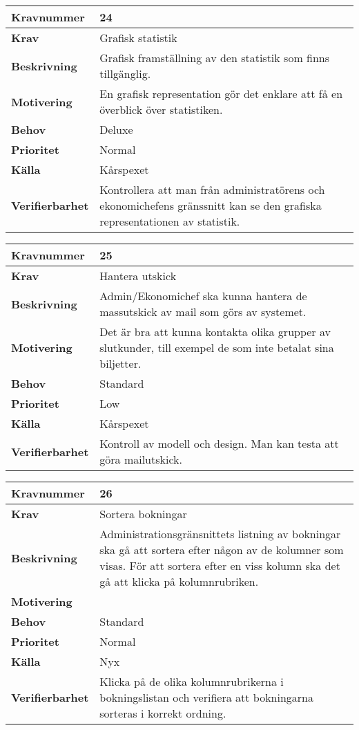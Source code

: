 \documentclass[a4paper, twoside, 11pt, titlepage]{article}
\begin{document}
\begin{tabular} { | p{3cm} | p{12.2cm} | }
	\hline
	\textbf{Kravnummer} & 24  \\
	\hline
	\textbf{Krav} & Grafisk statistik  \\
	\hline
	\textbf{Beskrivning} & Grafisk framställning av den statistik som finns tillgänglig.  \\
	\hline
	\textbf{Motivering} & En grafisk representation gör det enklare att få en överblick över statistiken.  \\
	\hline
	\textbf{Behov} & Deluxe  \\
	\hline
	\textbf{Prioritet} & Normal  \\
	\hline
	\textbf{Källa} & Kårspexet  \\
	\hline
	\textbf{Verifierbarhet} & Kontrollera att man från administratörens och ekonomichefens gränssnitt kan se den grafiska representationen av statistik.  \\
	\hline
\end{tabular}

\begin{tabular} { | p{3cm} | p{12.2cm} | }
	\hline
	\textbf{Kravnummer} & 25  \\
	\hline
	\textbf{Krav} & Hantera utskick  \\
	\hline
	\textbf{Beskrivning} & Admin/Ekonomichef ska kunna hantera de massutskick av mail som görs av systemet.  \\
	\hline
	\textbf{Motivering} & Det är bra att kunna kontakta olika grupper av slutkunder, till exempel de som inte betalat sina biljetter.  \\
	\hline
	\textbf{Behov} & Standard  \\
	\hline
	\textbf{Prioritet} & Low  \\
	\hline
	\textbf{Källa} & Kårspexet  \\
	\hline
	\textbf{Verifierbarhet} & Kontroll av modell och design. Man kan testa att göra mailutskick.  \\
	\hline
\end{tabular}

\begin{tabular} { | p{3cm} | p{12.2cm} | }
	\hline
	\textbf{Kravnummer} & 26  \\
	\hline
	\textbf{Krav} & Sortera bokningar  \\
	\hline
	\textbf{Beskrivning} & Administrationsgränsnittets listning av bokningar ska gå att sortera efter någon av de kolumner som visas. För att sortera efter en viss kolumn ska det gå att klicka på kolumnrubriken.  \\
	\hline
	\textbf{Motivering} &   \\
	\hline
	\textbf{Behov} & Standard  \\
	\hline
	\textbf{Prioritet} & Normal  \\
	\hline
	\textbf{Källa} & Nyx  \\
	\hline
	\textbf{Verifierbarhet} & Klicka på de olika kolumnrubrikerna i bokningslistan och verifiera att bokningarna sorteras i korrekt ordning.  \\
	\hline
\end{tabular}
\end{document}
